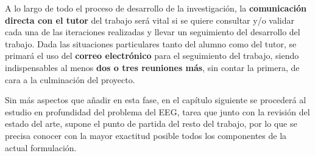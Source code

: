 A lo largo de todo el proceso de desarrollo de la investigación, la \textbf{comunicación directa con el tutor} del trabajo será vital si se quiere consultar y/o validar cada una de las iteraciones realizadas y llevar un seguimiento del desarrollo del trabajo. Dada las situaciones particulares tanto del alumno como del tutor, se primará el uso del \textbf{correo electrónico} para el seguimiento del trabajo, siendo indispensables al menos \textbf{dos o tres reuniones más}, sin contar la primera, de cara a la culminación del proyecto.

Sin más aspectos que añadir en esta fase, en el capítulo siguiente se procederá al estudio en profundidad del problema del EEG, tarea que junto con la revisión del estado del arte, supone el punto de partida del resto del trabajo, por lo que se precisa conocer con la mayor exactitud posible todos los componentes de la actual formulación.



